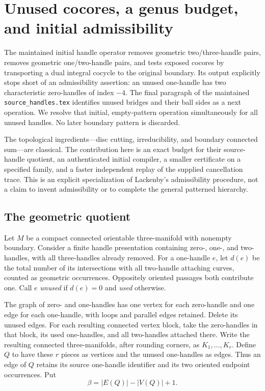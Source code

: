 \section{Unused cocores, a genus budget, and initial admissibility}
\label{sec:unused-handles}

The maintained initial handle operator removes geometric two/three-handle
pairs, removes geometric one/two-handle pairs, and tests exposed cocores by
transporting a dual integral cocycle to the original boundary.  Its output
explicitly stops short of an admissibility assertion: an unused one-handle
has two characteristic zero-handles of index $-4$.  The final paragraph of
the maintained \texttt{source\_handles.tex} identifies unused bridges and
their ball sides as a next operation.  We resolve that initial, empty-pattern
operation simultaneously for all unused handles.  No later boundary pattern
is discarded.

The topological ingredients---disc cutting, irreducibility, and boundary
connected sum---are classical.  The contribution here is an exact budget
for their source-handle quotient, an authenticated initial compiler, a
smaller certificate on a specified family, and a faster independent replay
of the supplied cancellation trace.  This is an explicit specialization of
Lackenby's admissibility procedure, not a claim to invent admissibility or
to complete the general patterned hierarchy.

\subsection{The geometric quotient}

Let $M$ be a compact connected orientable three-manifold with nonempty
boundary.  Consider a finite handle presentation containing zero-, one-,
and two-handles, with all three-handles already removed.  For a one-handle
$e$, let $d(e)$ be the total number of its intersections with all two-handle
attaching curves, counted as geometric occurrences.  Oppositely oriented
passages both contribute one.  Call $e$ \emph{unused} if $d(e)=0$ and
\emph{used} otherwise.

The graph of zero- and one-handles has one vertex for each zero-handle
and one edge for each one-handle, with loops and parallel edges retained.
Delete its unused edges.  For each resulting connected vertex block, take
the zero-handles in that block, its used one-handles, and all two-handles
attached there.  Write the resulting connected three-manifolds, after
rounding corners, as $K_1,\ldots,K_r$.  Define $Q$ to have these $r$ pieces
as vertices and the unused one-handles as edges.  Thus an edge of $Q$ retains
its source one-handle identifier and its two oriented endpoint occurrences.
Put
\[
  \beta=|E(Q)|-|V(Q)|+1.
\]

